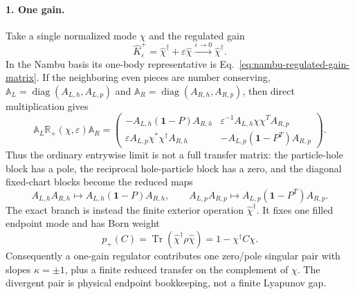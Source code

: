 \documentclass[aps,prb,onecolumn,nofootinbib,superscriptaddress]{revtex4-2}
\newcommand{\I}{\mathbf{1}}
\newcommand{\Tr}{\operatorname{Tr}}
\theoremstyle{plain}
\theoremstyle{definition}
\begin{document}
\paragraph*{1. One gain.}
Take a single normalized mode \(\chi\) and the regulated gain
\begin{equation}
  \hat K_\varepsilon^+
  =
  \hat\chi^\dagger+\varepsilon\hat\chi
  \xrightarrow{\varepsilon\to0}
  \hat\chi^\dagger .
  \label{eq:one-gain-regulated-limit}
\end{equation}
In the Nambu basis its one-body representative is
Eq.~\eqref{eq:nambu-regulated-gain-matrix}.  If the neighboring even pieces
are number conserving,
\(\mathbb A_L=\operatorname{diag}(A_{L,h},A_{L,p})\) and
\(\mathbb A_R=\operatorname{diag}(A_{R,h},A_{R,p})\), then direct
multiplication gives
\begin{equation}
  \mathbb A_L\mathbb R_+(\chi,\varepsilon)\mathbb A_R
  =
  \begin{pmatrix}
    -A_{L,h}(\I-P)A_{R,h}
    &
    \varepsilon^{-1}A_{L,h}\chi\chi^T A_{R,p}
    \\
    \varepsilon A_{L,p}\chi^*\chi^\dagger A_{R,h}
    &
    -A_{L,p}(\I-P^T)A_{R,p}
  \end{pmatrix}.
  \label{eq:one-gain-sandwiched-limit}
\end{equation}
Thus the ordinary entrywise limit is not a full transfer matrix: the
particle-hole block has a pole, the reciprocal hole-particle block has a
zero, and the diagonal fixed-chart blocks become the reduced maps
\begin{equation}
  A_{L,h}A_{R,h}\mapsto A_{L,h}(\I-P)A_{R,h},
  \qquad
  A_{L,p}A_{R,p}\mapsto A_{L,p}(\I-P^T)A_{R,p}.
  \label{eq:one-gain-reduced-diagonal-blocks}
\end{equation}
The exact branch is instead the finite exterior operation
\(\hat\chi^\dagger\).  It fixes one filled endpoint mode and has Born weight
\begin{equation}
  p_+(C)=\Tr(\hat\chi^\dagger\rho\hat\chi)=1-\chi^\dagger C\chi .
  \label{eq:one-gain-born-limit}
\end{equation}
Consequently a one-gain regulator contributes one zero/pole singular pair
with slopes \(\kappa=\pm1\), plus a finite reduced transfer on the complement
of \(\chi\).  The divergent pair is physical endpoint bookkeeping, not a
finite Lyapunov gap.
\end{document}
